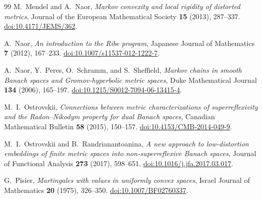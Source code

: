 \begin{thebibliography}{99}
M.~Mendel and A.~Naor,
\emph{Markov convexity and local rigidity of distorted metrics},
Journal of the European Mathematical Society \textbf{15} (2013), 287--337.
\href{https://doi.org/10.4171/JEMS/362}{doi:10.4171/JEMS/362}.

A.~Naor,
\emph{An introduction to the Ribe program},
Japanese Journal of Mathematics \textbf{7} (2012), 167--233.
\href{https://doi.org/10.1007/s11537-012-1222-7}{doi:10.1007/s11537-012-1222-7}.

A.~Naor, Y.~Peres, O.~Schramm, and S.~Sheffield,
\emph{Markov chains in smooth Banach spaces and Gromov-hyperbolic metric spaces},
Duke Mathematical Journal \textbf{134} (2006), 165--197.
\href{https://doi.org/10.1215/S0012-7094-06-13415-4}{doi:10.1215/S0012-7094-06-13415-4}.

M.~I.~Ostrovskii,
\emph{Connections between metric characterizations of superreflexivity and the Radon--Nikodym property for dual Banach spaces},
Canadian Mathematical Bulletin \textbf{58} (2015), 150--157.
\href{https://doi.org/10.4153/CMB-2014-049-9}{doi:10.4153/CMB-2014-049-9}.

M.~I.~Ostrovskii and B.~Randrianantoanina,
\emph{A new approach to low-distortion embeddings of finite metric spaces into non-superreflexive Banach spaces},
Journal of Functional Analysis \textbf{273} (2017), 598--651.
\href{https://doi.org/10.1016/j.jfa.2017.03.017}{doi:10.1016/j.jfa.2017.03.017}.

G.~Pisier,
\emph{Martingales with values in uniformly convex spaces},
Israel Journal of Mathematics \textbf{20} (1975), 326--350.
\href{https://doi.org/10.1007/BF02760337}{doi:10.1007/BF02760337}.

\end{thebibliography}
